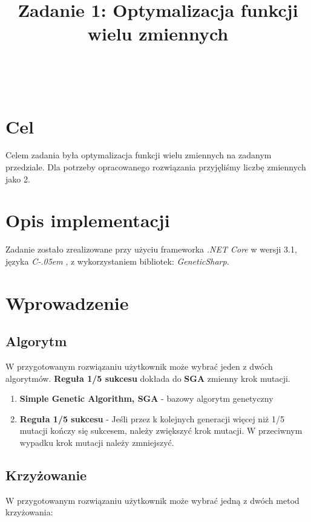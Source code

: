 \documentclass{classrep}
\author{%
  \\
  \studentinfo[234067@edu.p.lodz.pl]{Bartosz Jurczewski}{234067}\\
  \studentinfo[234106@edu.p.lodz.pl]{Karol Podlewski}{234106}%
}
\title{Zadanie 1: Optymalizacja funkcji wielu zmiennych}
\newcommand{\Csharp}{%
  {\settoheight{\dimen0}{C}C\kern-.05em \resizebox{!}{\dimen0}{\raisebox{\depth}{\# }}}}
\begin{document}
\maketitle
\thispagestyle{fancyplain}

\clearpage

\section{Cel}

Celem zadania była optymalizacja funkcji wielu zmiennych na zadanym
przedziale. Dla potrzeby opracowanego rozwiązania przyjęliśmy liczbę zmiennych jako 2.


\section{Opis implementacji}

Zadanie zostało zrealizowane przy użyciu frameworka \textit{.NET Core} w wersji 3.1, języka \textit{\Csharp}, z wykorzystaniem bibliotek: \textit{GeneticSharp}\cite{GeneticSharp}.


\section{Wprowadzenie}

\subsection{Algorytm}
W przygotowanym rozwiązaniu użytkownik może wybrać jeden z dwóch algorytmów. \textbf{Reguła 1/5 sukcesu} dokłada do \textbf{SGA} zmienny krok mutacji.

\begin{enumerate}
    \item \textbf{Simple Genetic Algorithm, SGA} - bazowy algorytm genetyczny 
    \item \textbf{Reguła 1/5 sukcesu} - Jeśli przez k kolejnych generacji więcej niż 1/5 mutacji kończy się sukcesem, należy zwiększyć krok mutacji. W przeciwnym wypadku krok mutacji należy zmniejszyć.
\end{enumerate}

\subsection{Krzyżowanie}

W przygotowanym rozwiązaniu użytkownik może wybrać jedną z dwóch metod krzyżowania:
\end{document}

